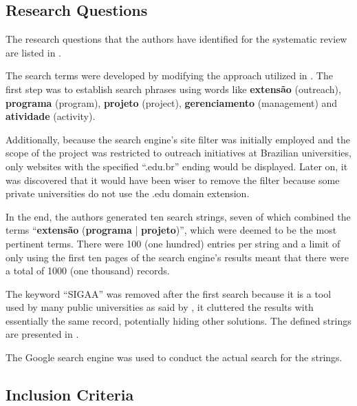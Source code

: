 

\subsection{Research Questions}\label{sec:gl-planning-rq}

The research questions that the authors have identified for the systematic review are listed in .



The search terms were developed by modifying the approach utilized in \cite{godin2015applying}. The first step was to establish search phrases using words like \textbf{extensão} (outreach), \textbf{programa} (program), \textbf{projeto} (project), \textbf{gerenciamento} (management) and \textbf{atividade} (activity).

Additionally, because the search engine's site filter was initially employed and the scope of the project was restricted to outreach initiatives at Brazilian universities, only websites with the specified ``.edu.br'' ending would be displayed. Later on, it was discovered that it would have been wiser to remove the filter because some private universities do not use the .edu domain extension.

In the end, the authors generated ten search strings, seven of which combined the terms ``\textbf{extensão} (\textbf{programa} | \textbf{projeto})'', which were deemed to be the most pertinent terms. There were 100 (one hundred) entries per string and a limit of only using the first ten pages of the search engine's results meant that there were a total of 1000 (one thousand) records.

The keyword ``\acs{SIGAA}'' was removed after the first search because it is a tool used by many public universities as said by \textcite{das2013sistema}, it cluttered the results with essentially the same record, potentially hiding other solutions. The defined strings are presented in .



The Google search engine was used to conduct the actual search for the strings.

\subsection{Inclusion Criteria}\label{sec:gl-planning-inc}

